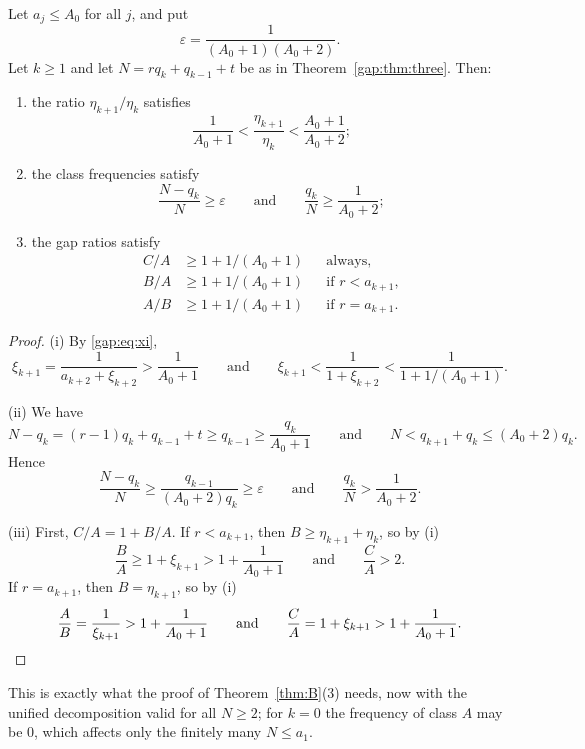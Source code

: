 \begin{corollary}\label{gap:cor:bdd}
Let $a_j\le A_0$ for all $j$, and put
\[
\varepsilon=\frac1{(A_0+1)(A_0+2)}.
\]
Let $k\ge1$ and let $N=rq_k+q_{k-1}+t$ be as in Theorem~\ref{gap:thm:three}. Then:
\begin{enumerate}
\item[(i)] the ratio $\eta_{k+1}/\eta_k$ satisfies
\[
\frac1{A_0+1}<\frac{\eta_{k+1}}{\eta_k}<\frac{A_0+1}{A_0+2};
\]
\item[(ii)] the class frequencies satisfy
\[
\frac{N-q_k}N\ge\varepsilon\qquad\text{and}\qquad\frac{q_k}N\ge\frac1{A_0+2};
\]
\item[(iii)] the gap ratios satisfy
\begin{align*}
C/A&\ge1+1/(A_0+1) &&\text{always},\\
B/A&\ge1+1/(A_0+1) &&\text{if }r<a_{k+1},\\
A/B&\ge1+1/(A_0+1) &&\text{if }r=a_{k+1}.
\end{align*}
\end{enumerate}
\end{corollary}
\begin{proof}
(i) By \eqref{gap:eq:xi},
\[
\xi_{k+1}=\frac1{a_{k+2}+\xi_{k+2}}>\frac1{A_0+1}
\qquad\text{and}\qquad
\xi_{k+1}<\frac1{1+\xi_{k+2}}<\frac1{1+1/(A_0+1)}.
\]

(ii) We have
\[
N-q_k=(r-1)q_k+q_{k-1}+t\ge q_{k-1}\ge\frac{q_k}{A_0+1}
\qquad\text{and}\qquad
N<q_{k+1}+q_k\le(A_0+2)q_k.
\]
Hence
\[
\frac{N-q_k}N\ge\frac{q_{k-1}}{(A_0+2)q_k}\ge\varepsilon
\qquad\text{and}\qquad
\frac{q_k}N>\frac1{A_0+2}.
\]

(iii) First, $C/A=1+B/A$. If $r<a_{k+1}$, then $B\ge\eta_{k+1}+\eta_k$, so by (i)
\[
\frac BA\ge1+\xi_{k+1}>1+\frac1{A_0+1}
\qquad\text{and}\qquad
\frac CA>2.
\]
If $r=a_{k+1}$, then $B=\eta_{k+1}$, so by (i)
\[
\frac AB=\frac1{\xi_{k+1}}>1+\frac1{A_0+1}
\qquad\text{and}\qquad
\frac CA=1+\xi_{k+1}>1+\frac1{A_0+1}.\qedhere
\]
\end{proof}
This is exactly what the proof of Theorem~\ref{thm:B}(3) needs, now
with the unified decomposition valid for all $N\ge2$; for $k=0$ the frequency of class $A$ may be $0$, which affects only the finitely many $N\le a_1$.


